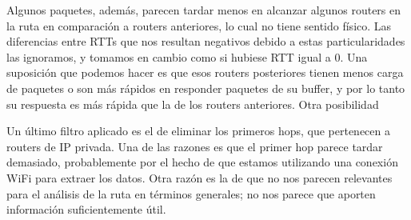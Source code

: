 Algunos paquetes, además, parecen tardar menos en alcanzar algunos routers en la
ruta en comparación a routers anteriores, lo cual no tiene sentido físico. Las
diferencias entre RTTs que nos resultan negativos debido a estas
particularidades las ignoramos, y tomamos en cambio como si hubiese RTT igual a
0. Una suposición que podemos hacer es que esos routers posteriores tienen menos
carga de paquetes o son más rápidos en responder paquetes de su buffer, y por lo
tanto su respuesta es más rápida que la de los routers anteriores. Otra posibilidad

Un último filtro aplicado es el de eliminar los primeros hops, que pertenecen
a routers de IP privada. Una de las razones es que el primer hop parece
tardar demasiado, probablemente por el hecho de que estamos utilizando una 
conexión WiFi para extraer los datos. Otra razón es la de que no nos parecen
relevantes para el análisis de la ruta en términos generales; no nos parece que
aporten información suficientemente útil.
